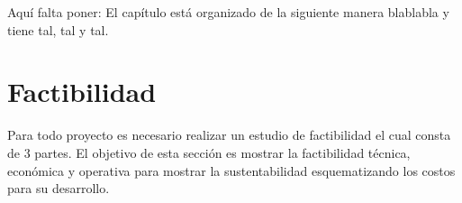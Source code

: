





Aquí falta poner: El capítulo está organizado de la siguiente manera blablabla y tiene tal, tal y tal.


\section{Factibilidad}

Para todo proyecto es necesario realizar un estudio de factibilidad el cual consta de 3 partes. El objetivo de esta sección es mostrar la factibilidad técnica, económica y operativa para mostrar la sustentabilidad esquematizando los costos para su desarrollo.










